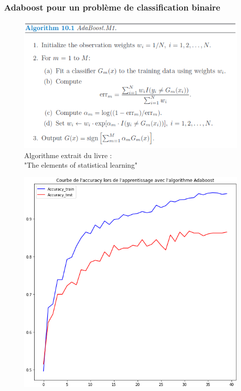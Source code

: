 \documentclass{beamer}
\theoremstyle{definition}
\begin{document}
\begin{frame}
	\frametitle{Adaboost pour un problème de classification binaire }
		\begin{minipage}[t]{1\linewidth}
		\begin{minipage}[t]{0.53\linewidth}\centering\begin{figure}
				\centering
				\includegraphics[width=1\linewidth]{adaboost0.png}
				Algorithme extrait du livre :\\ "The elements of statistical learning" 
		\end{figure}\end{minipage}\hfill 
		\begin{minipage}[t]{0.47\linewidth}\centering\begin{figure}
				\begin{center}
					\centering
					\includegraphics[width=1\linewidth]{adaboost1.png}
				\end{center}
				
		\end{figure}\end{minipage}
	\end{minipage}
	
\end{frame}
\end{document}
